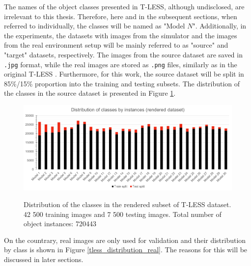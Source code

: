 \documentclass[english, 12pt, a4paper, elec, utf8, a-1b, online]{aaltothesis}
\begin{document}
The names of the object classes presented in T-LESS, although undisclosed, are irrelevant to this thesis. Therefore, here and in the subsequent sections, when referred to individually, the classes will be named as "Model $N$". Additionally, in the experiments, the datasets with images from the simulator and the images from the real environment setup will be mainly referred to as "source" and "target" datasets, respectively. The images from the source dataset are saved in \texttt{.jpg} format, while the real images are stored as \texttt{.png} files, similarly as in the original T-LESS \cite{hodan2017tless}. Furthermore, for this work, the source dataset will be split in 85\%/15\%  proportion into the training and testing subsets. The distribution of the classes in the source dataset is presented in Figure \ref{tless_distribution_rend}.  

\begin{figure}[htb]
	\begin{center}
		\includegraphics[width=14cm]{./rendered_distribution.png}
	\end{center}
	\caption{Distribution of the classes in the rendered subset of T-LESS dataset. 42 500 training images and 7 500 testing images. Total number of object instances: 720443}
	\begin{center}
		\label{tless_distribution_rend}
	\end{center}
\end{figure}
\FloatBarrier

On the countrary, real images are only used for validation and their distribution by class is shown in Figure \ref{tless_distribution_real}. The reasons for this will be discussed in later sections. 
\end{document}
